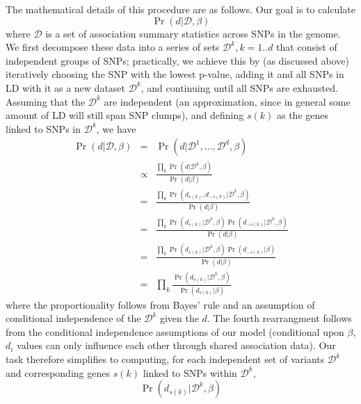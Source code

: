 The mathematical details of this procedure are as follows. Our goal is
to calculate
\[\Pr\left(d|\mathcal{D},\beta\right)\]
where $\mathcal{D}$ is a set of association summary statistics
across SNPs in the genome. We first decompose these data into a series
of sets $\mathcal{D}^k, k=1..d$ that consist of independent groups of
SNPs; practically, we achieve this by (as discussed above) iteratively
choosing the SNP with the lowest p-value, adding it and all SNPs in LD
with it as a new dataset $\mathcal{D}^k$, and continuing until all
SNPs are exhausted. Assuming that the $\mathcal{D}^k$ are independent
(an approximation, since in general some amount of LD will still span
SNP clumps), and defining $s(k)$ as the genes linked to SNPs in
$\mathcal{D}^k$, we have
\begin{eqnarray*}
  \Pr\left(d|\mathcal{D},\beta\right) &=&
  \Pr\left(d|\mathcal{D}^1,\ldots,\mathcal{D}^d,\beta\right) \\
  &\propto& \frac{\prod_k \Pr\left(d|\mathcal{D}^k,\beta\right)}{\Pr\left(d|\beta\right)} \\
  &=& \frac{\prod_k
    \Pr\left(d_{s(k)},d_{-s(k)}|\mathcal{D}^k,\beta\right)}{\Pr\left(d|\beta\right)} \\
  &=& \frac{\prod_k
    \Pr\left(d_{s(k)}|\mathcal{D}^k,\beta\right)\Pr\left(d_{-s(k)}|\mathcal{D}^k,\beta\right)}{\Pr\left(d|\beta\right)} \\
  &=& \frac{\prod_k
    \Pr\left(d_{s(k)}|\mathcal{D}^k,\beta\right)\Pr\left(d_{-s(k)}|\beta\right)}{\Pr\left(d|\beta\right)} \\
  &=& \prod_k
  \frac{\Pr\left(d_{s(k)}|\mathcal{D}^k,\beta\right)}{\Pr\left(d_{s(k)}|\beta\right)} \label{eq:combine_sig}
\end{eqnarray*}
where the proportionality follows from Bayes' rule and an assumption
of conditional independence of the $\mathcal{D}^k$ given the $d$. The
fourth rearrangment follows from the conditional independence
assumptions of our model (conditional upon $\beta$, $d_i$ values can
only influence each other through shared association data).
Our task therefore simplifies to computing, for each independent set of
variants $\mathcal{D}^k$ and corresponding genes $s(k)$ linked to SNPs
within $\mathcal{D}^k$,
\[  \Pr\left(d_{s(k)}|\mathcal{D}^k,\beta\right)\]

